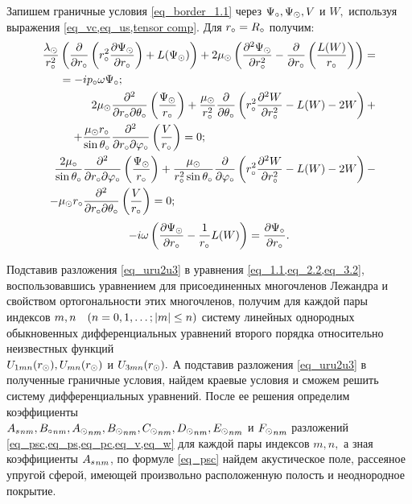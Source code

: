 Запишем граничные условия \cref{eq_border_1.1} через $\P\c, \P\s, V$ и $W,$ используя выражения \cref{eq_vc,eq_us,tensor comp}. Для $r\c=R\c$ получим:
\begin{align}
\begin{split}
\fr{\la\s}{r\c^2}&\left(\fr{\de}{\de r\c}\left(r\c^2\fr{\de\P\s}{\de r\c}\right)+L(\P\s)\right) + 2\mu\s\left(\fr{\de^2 \P\s}{\de r\c^2} - \fr{\de}{\de r\c}\left(\fr{L(W)}{r\c}\right)\right) = \\
& = - ip\c\om\P\c;
\end{split}\\
\begin{split}
2\mu\s&\fr{\de^2}{\de r\c\de\Q\c}\left(\fr{\P\s}{r\c}\right)+ \fr{\mu\s}{r\c^2}\fr{\de}{\de\Q\c}\left(r\c^2\fr{\de^2 W}{\de r\c^2} - L(W) - 2W\right) + \\
+ \fr{\mu\s r\c}{\sin\Q\c}&\fr{\de^2}{\de r\c\de\f\c}\left(\fr{V}{r\c}\right) = 0;
\end{split}\\
\begin{split}
\fr{2\mu\c}{\sin\Q\c}&\fr{\de^2}{\de r\c\de\f\c}\left(\fr{\P\s}{r\c}\right)+ \fr{\mu\s}{r\c^2\sin\Q\c}\fr{\de}{\de\f\c}\left(r\c^2\fr{\de^2 W}{\de r\c^2} - L(W) - 2W\right) - \\
- \mu\s r\c&\fr{\de^2}{\de r\c\de\Q\c}\left(\fr{V}{r\c}\right) = 0;
\end{split}
\end{align}
\begin{equation}
-i\om \left(\fr{\de \P\s}{\de r\c} - \fr{1}{r\c}L(W)\right) = \fr{\de \P\c}{\de r\c}.
\end{equation}

Подставив разложения \cref{eq_uru2u3} в уравнения \cref{eq_1.1,eq_2.2,eq_3.2}, воспользовавшись уравнением для присоединенных многочленов Лежандра и свойством ортогональности этих многочленов, получим для каждой пары индексов $m,n \q(n = 0,1,\ldots; \lvert m\rvert\leq n)$ систему линейных однородных обыкновенных дифференциальных уравнений второго порядка относительно неизвестных функций \\ $U_{1mn}(r\s), U_{mn}(r\s)$ и $U_{3mn}(r\s).$ А подставив разложения \cref{eq_uru2u3} в полученные граничные условия, найдем краевые условия и сможем решить  систему дифференциальных уравнений. После ее решения определим коэффициенты \\
${A\sc}_{nm}, {B\c}_{nm}, {A\s}_{nm}, {B\s}_{nm}, {C\s}_{nm}, {D\s}_{nm}, {E\s}_{nm}$ и $ {F\s}_{nm}$ разложений  \cref{eq_psc,eq_ps,eq_pc,eq_v,eq_w} для каждой пары индексов $m,n,$ а зная коэффициенты ${A\sc}_{nm}$, по формуле \cref{eq_psc} найдем акустическое поле, рассеяное упругой сферой, имеющей произвольно расположенную полость и неоднородное покрытие.

